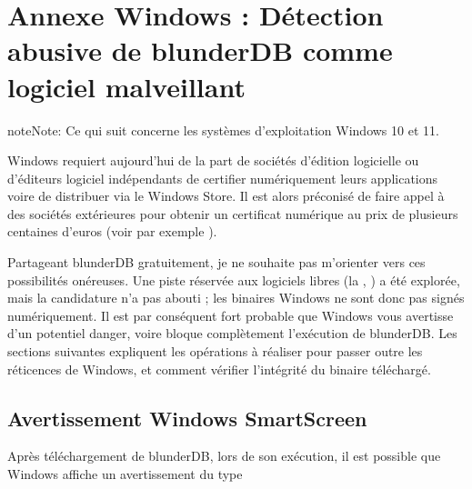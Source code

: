 \documentclass[letterpaper,10pt,french]{sphinxmanual}
\begin{document}
\section{Annexe Windows : Détection abusive de blunderDB comme logiciel malveillant}
\label{\detokenize{annexe_windows_securite:annexe-windows-detection-abusive-de-blunderdb-comme-logiciel-malveillant}}\label{\detokenize{annexe_windows_securite:annexe-windows-malware}}\label{\detokenize{annexe_windows_securite::doc}}
\begin{sphinxadmonition}{note}{Note:}
\sphinxAtStartPar
Ce qui suit concerne les systèmes d’exploitation Windows 10 et 11.
\end{sphinxadmonition}

\sphinxAtStartPar
Windows requiert aujourd’hui de la part de sociétés d’édition logicielle ou
d’éditeurs logiciel indépendants de certifier numériquement leurs applications
voire de distribuer via le Windows Store. Il est alors préconisé de faire appel
à des sociétés extérieures pour obtenir un certificat numérique au prix de
plusieurs centaines d’euros (voir par exemple
).

\sphinxAtStartPar
Partageant blunderDB gratuitement, je ne souhaite pas m’orienter vers ces
possibilités onéreuses. Une piste  réservée aux logiciels libres
(la , ) a été explorée, mais la
candidature n’a pas abouti ; les binaires Windows ne sont donc pas signés
numériquement. Il est par conséquent fort probable que Windows vous avertisse
d’un potentiel danger, voire bloque complètement l’exécution de blunderDB. Les
sections suivantes expliquent les opérations à réaliser pour passer outre les
réticences de Windows, et comment vérifier l’intégrité du binaire téléchargé.


\subsection{Avertissement Windows SmartScreen}
\label{\detokenize{annexe_windows_securite:avertissement-windows-smartscreen}}
\sphinxAtStartPar
Après téléchargement de blunderDB, lors de son exécution, il est possible que
Windows affiche un avertissement du type

\begin{figure}[htbp]
\centering

\noindent{}
\end{figure}
\end{document}
